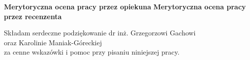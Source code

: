 \newpage
\linespread{1.3}
\selectfont
\newpage
\textbf{Merytoryczna ocena pracy przez opiekuna}
\newpage
\textbf{Merytoryczna ocena pracy przez recenzenta}
\newpage
\vspace*{\fill}

\begin{flushright}
Składam serdeczne podziękowanie
dr inż. Grzegorzowi Gachowi \\oraz Karolinie Maniak-Góreckiej \\za
cenne wskazówki i pomoc przy
pisaniu niniejszej pracy.
\end{flushright}
\noindent


\vspace{85mm}
\tableofcontents

